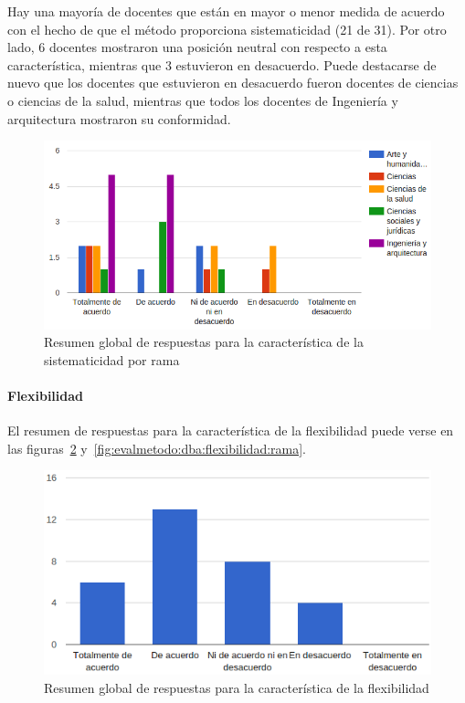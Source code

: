 Hay una mayoría de docentes que están en mayor o menor medida de acuerdo con el hecho de que el método proporciona sistematicidad (21 de 31). Por otro lado, 6 docentes mostraron una posición neutral con respecto a esta característica, mientras que 3 estuvieron en desacuerdo. Puede destacarse de nuevo que los docentes que estuvieron en desacuerdo fueron docentes de ciencias o ciencias de la salud, mientras que todos los docentes de Ingeniería y arquitectura mostraron su conformidad.

\begin{figure}[h]
  \begin{center}
    \includegraphics[scale=0.40]{C_DBA_sistematicidad_rama.png}
  \end{center}
  \caption{Resumen global de respuestas para la característica de la sistematicidad por rama}
  \label{fig:evalmetodo:dba:sistematicidad:rama}
\end{figure}


\newpage
\paragraph*{Flexibilidad}

El resumen de respuestas para la característica de la flexibilidad puede verse en las figuras~\ref{fig:evalmetodo:dba:flexibilidad} y~\ref{fig:evalmetodo:dba:flexibilidad:rama}.

\begin{figure}[h]
  \begin{center}
    \includegraphics[scale=0.5]{C_DBA_flexibilidad.png}
  \end{center}
  \caption{Resumen global de respuestas para la característica de la flexibilidad}
  \label{fig:evalmetodo:dba:flexibilidad}
\end{figure}

